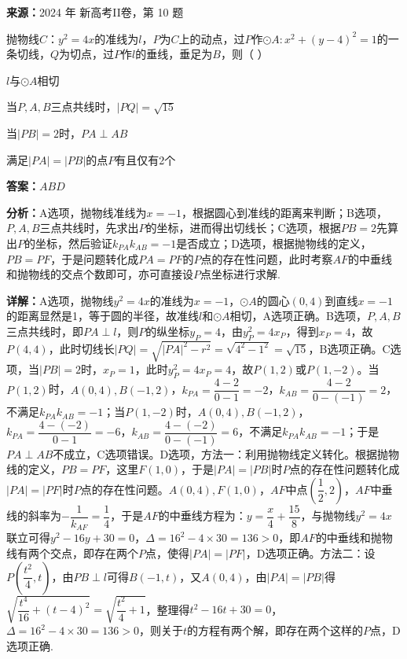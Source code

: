\begin{question}[points=6]
\textbf{来源：}2024 年 新高考II卷，第 10 题\par
抛物线$C：y^2=4x$的准线为$l$，$P$为$C$上的动点，过$P$作$\odot A: x^2+(y-4)^2=1$的一条切线，$Q$为切点，过$P$作$l$的垂线，垂足为$B$，则（ ）
\begin{choices}
  \item $l$与$\odot A$相切
  \item 当$P,A,B$三点共线时，$|PQ|=\sqrt{15}$
  \item 当$|PB|=2$时，$PA\perp AB$
  \item 满足$|PA|=|PB|$的点$P$有且仅有2个
\end{choices}
\begin{solution}
\textbf{答案：}$ABD$

\textbf{分析：}A选项，抛物线准线为$x=-1$，根据圆心到准线的距离来判断；B选项，$P,A,B$三点共线时，先求出$P$的坐标，进而得出切线长；C选项，根据$PB=2$先算出$P$的坐标，然后验证$k_{PA}k_{AB}=-1$是否成立；D选项，根据抛物线的定义，$PB=PF$，于是问题转化成$PA=PF$的$P$点的存在性问题，此时考察$AF$的中垂线和抛物线的交点个数即可，亦可直接设$P$点坐标进行求解.

\textbf{详解：}A选项，抛物线$y^2=4x$的准线为$x=-1$，$\odot A$的圆心$(0,4)$到直线$x=-1$的距离显然是1，等于圆的半径，故准线$l$和$\odot A$相切，A选项正确。B选项，$P,A,B$三点共线时，即$PA\perp l$，则$P$的纵坐标$y_P=4$，由$y_P^2=4x_P$，得到$x_P=4$，故$P(4,4)$，此时切线长$|PQ|=\sqrt{|PA|^2-r^2}=\sqrt{4^2-1^2}=\sqrt{15}$，B选项正确。C选项，当$|PB|=2$时，$x_P=1$，此时$y_P^2=4x_P=4$，故$P(1,2)$或$P(1,-2)$。当$P(1,2)$时，$A(0,4),B(-1,2)$，$k_{PA}=\dfrac{4-2}{0-1}=-2$，$k_{AB}=\dfrac{4-2}{0-(-1)}=2$，不满足$k_{PA}k_{AB}=-1$；当$P(1,-2)$时，$A(0,4),B(-1,2)$，$k_{PA}=\dfrac{4-(-2)}{0-1}=-6$，$k_{AB}=\dfrac{4-(-2)}{0-(-1)}=6$，不满足$k_{PA}k_{AB}=-1$；于是$PA\perp AB$不成立，C选项错误。D选项，方法一：利用抛物线定义转化。根据抛物线的定义，$PB=PF$，这里$F(1,0)$，于是$|PA|=|PB|$时$P$点的存在性问题转化成$|PA|=|PF|$时$P$点的存在性问题。$A(0,4),F(1,0)$，$AF$中点$(\dfrac{1}{2},2)$，$AF$中垂线的斜率为$-\dfrac{1}{k_{AF}}=\dfrac{1}{4}$，于是$AF$的中垂线方程为：$y=\dfrac{x}{4}+\dfrac{15}{8}$，与抛物线$y^2=4x$联立可得$y^2-16y+30=0$，$\Delta=16^2-4\times30=136>0$，即$AF$的中垂线和抛物线有两个交点，即存在两个$P$点，使得$|PA|=|PF|$，D选项正确。方法二：设$P\left(\dfrac{t^2}{4},t\right)$，由$PB\perp l$可得$B(-1,t)$，又$A(0,4)$，由$|PA|=|PB|$得$\sqrt{\dfrac{t^4}{16}+(t-4)^2}=\sqrt{\dfrac{t^2}{4}+1}$，整理得$t^2-16t+30=0$，$\Delta=16^2-4\times30=136>0$，则关于$t$的方程有两个解，即存在两个这样的$P$点，D选项正确.
\end{solution}
\end{question}

